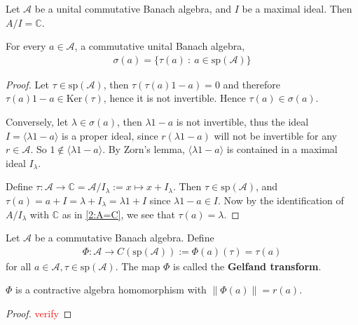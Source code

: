 \begin{corollary}
  Let $\mathcal{A}$ be a unital commutative Banach algebra, and $I$
  be a maximal ideal. Then $A/I = \mathbb{C}$.
\end{corollary}

\begin{lemma}
  For every $a \in \mathcal{A}$, a commutative unital Banach algebra,
  \begin{align*}
    \sigma(a) = \{ \tau(a)  \ : \   a \in \textrm{sp}(\mathcal{  A}) \}
  \end{align*}
\end{lemma}
\begin{proof}
  Let $\tau \in \textrm{sp}(\mathcal{A})$, then $\tau(\tau(a)1 -
  a) = 0$ and therefore $\tau(a)1 - a \in \textrm{Ker}(\tau)$,
  hence it is not invertible. Hence $\tau(a) \in \sigma(a)$.

  Conversely, let $ \lambda \in \sigma(a)$, then $\lambda 1 - a$ is
  not invertible, thus the ideal $I = \langle \lambda1 - a \rangle$
  is a proper ideal, since $r(\lambda 1 - a)$ will not be invertible
  for any $r \in \mathcal{A}$. So $1 \notin \langle \lambda1 - a
  \rangle$. By Zorn's lemma, $\langle \lambda1 -a \rangle $ is
  contained in a maximal ideal $I_\lambda$.

  Define $\tau: \mathcal{A} \to \mathbb{C} = \mathcal{A}/I_\lambda :=
  x \mapsto x + I_\lambda$. Then $\tau \in \textrm{sp}(\mathcal{A})$,
  and $\tau(a) = a + I = \lambda + I_\lambda = \lambda1 + I$ since
  $\lambda1 - a \in I$. Now by the identification of $A/I_\lambda$
  with $\mathbb{C}$ as in \autoref{2:A=C}, we see that $\tau(a) =
  \lambda$.
\end{proof}

\begin{definition}
  Let $\mathcal{A}$ be a commutative Banach algebra. Define
  \begin{align*}
    \Phi :  \mathcal{A} \to  C(\textrm{sp}(\mathcal{A})) :=
    \Phi(a)(\tau) = \tau(a)
  \end{align*}
  for all $a \in \mathcal{A}, \tau \in \textrm{sp}(\mathcal{A})$. The
  map $\Phi$ is called the \textbf{Gelfand transform}.
\end{definition}

\begin{theorem}
  $\Phi$ is a contractive algebra homomorphism with $\| \Phi(a)\| = r(a)$.
\end{theorem}
\begin{proof}
  \textcolor{red}{verify}
\end{proof}

